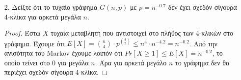 \documentclass[a4paper, oneside, 11pt]{article}
\newtheorem{lm}[thm]{Λήμμα}
\theoremstyle{definition}
\newcommand{\pr}{\mathbb{P}}
\newcommand{\ex}{\mathbb{E}}
\begin{document}
\begin{enumerate}
\begin{proof}
      \begin{lm}
         \label{lm1.3}
         Αν $X \sim B(n, p)$ τότε $\ex[X] = np$.
      \end{lm}
      \begin{proof}
         \begin{align*}
            \ex[X] &= \sum_{i=0}^{n} i \cdot \pr[X = i]\\
                   &= \sum_{i=0}^{n} i {n \choose i} p^i (1-p)^{n-i}\\
                   &= \sum_{i=1}^{n} np {n-1 \choose i-1} p^{i-1}
                      (1-p)^{(n-1) - (i-1)}\\
                   &= np \sum_{i=0}^{n-1} {n-1 \choose i} p^{i}
                      (1-p)^{(n-1) - i}\\
                   &= np \cdot (p + (1-p))^{n-1} = np\\
         \end{align*}
      \end{proof}

      Για το γράφημα $G(n, p)$ έχουμε
      ότι ο βαθμός μιας κορυφής $v_i$ είναι μια τυχαία μεταβλητή $d_i$ που ακολουθεί
      την κατανομή Bernoulli με παραμέτρους $n-1, p$, δηλαδή $d_i \sim B(n-1,
      p)$.

      Για τον μέσο βαθμό κορυφής ισχύει:

      \[ d(G) = \frac{\sum_{i=1}^{n} d_i}{n} \]

      όπου $X = \sum_{i=1}^{n} d_i$.
      
      Σύμφωνα με το Λήμμα \ref{lm1.2} έχουμε ότι $X \sim B \left(\sum_{i=1}^{n}
      (n-1), p \right) = B( n(n-1), p)$.

      Από το Λήμμα \ref{lm1.3}, $\ex[X] = n(n-1)p$. Άρα έχουμε ότι:

      \[ \ex[d(G)] = \frac1n \ex[X] = (n-1)p \]
   \end{proof}

\item[2.]
   Δείξτε ότι το τυχαίο γράφημα $G(n, p)$ με $p = n^{-0.7}$ δεν έχει σχεδόν
   σίγουρα 4-κλίκα για αρκετά μεγάλα $n$.

   \begin{proof}
Έστω $X$ τυχαία μεταβλητή που αντιστοιχεί στο πλήθος των 4-κλικών στο γράφημα. Έχουμε ότι $E[X] = {n \choose 4} \cdot p^{4 \choose 2} \leq n^4 \cdot n^{-4.2} = n^{-0.2}$. Από την ανισότητα του Markov
έχουμε λοιπόν ότι $Pr[X\geq 1] \leq E[X] = n^{-0.2}$, το οποίο τείνει στο 0 για μεγάλα $n$. Άρα για αρκετά μεγάλο $n$ το γράφημα δεν θα περιέχει σχεδόν σίγουρα 4-κλίκα.
   \end{proof}


\end{enumerate}
\end{document}
